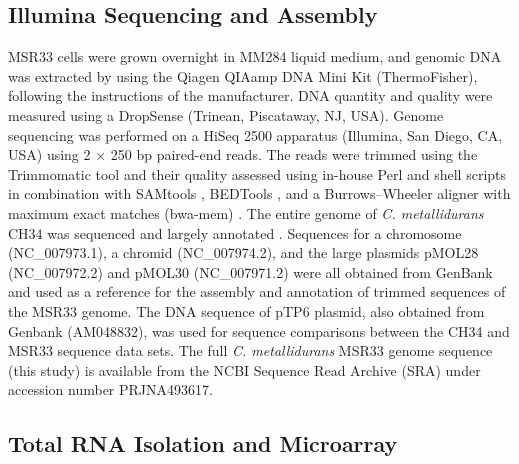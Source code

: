 \subsection{Illumina Sequencing and Assembly}
MSR33 cells were grown overnight in MM284 liquid medium, and genomic DNA was extracted by using the Qiagen QIAamp DNA Mini Kit (ThermoFisher), following the instructions of the manufacturer. DNA quantity and quality were measured using a DropSense (Trinean, Piscataway, NJ, USA). Genome sequencing was performed on a HiSeq 2500 apparatus (Illumina, San Diego, CA, USA) using 2 × 250 bp paired-end reads. The reads were trimmed using the Trimmomatic tool \citep{bolger2014trimmomatic} and their quality assessed using in-house Perl and shell scripts in combination with SAMtools \citep{li2009sequence}, BEDTools \citep{quinlan2014bedtools}, and a Burrows–Wheeler aligner with maximum exact matches (bwa-mem) \citep{li2013aligning}.
The entire genome of \textit{C. metallidurans} CH34 was sequenced and largely annotated \citep{janssen2010complete, monchy2007plasmids}. Sequences for a chromosome (NC\_007973.1), a chromid (NC\_007974.2), and the large plasmids pMOL28 (NC\_007972.2) and pMOL30 (NC\_007971.2) were all obtained from GenBank and used as a reference for the assembly and annotation of trimmed sequences of the MSR33 genome. The DNA sequence of pTP6 plasmid, also obtained from Genbank (AM048832), was used for sequence comparisons between the CH34 and MSR33 sequence data sets. The full \textit{C. metallidurans} MSR33 genome sequence (this study) is available from the NCBI Sequence Read Archive (SRA) under accession number PRJNA493617.

\subsection{Total RNA Isolation and Microarray}

